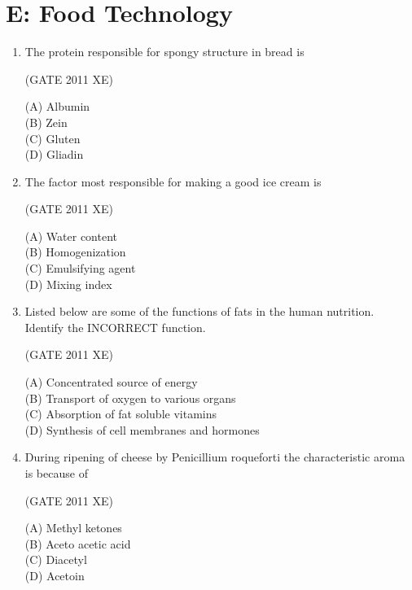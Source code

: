 \documentclass[journal,12pt,onecolumn]{IEEEtran}
\begin{document}
\section*{E: Food Technology}
\vspace{1cm}

\begin{enumerate}

\item The protein responsible for spongy structure in bread is

\hfill{(GATE 2011 XE)} \\
\begin{multicols}{4}
(A) Albumin \\
(B) Zein \\
(C) Gluten \\
(D) Gliadin
\end{multicols}


\item The factor most responsible for making a good ice cream is

\hfill{(GATE 2011 XE)} \\
\begin{multicols}{4}
(A) Water content \\
(B) Homogenization \\
(C) Emulsifying agent \\
(D) Mixing index
\end{multicols}

\item Listed below are some of the functions of fats in the human nutrition. Identify the INCORRECT function.

\hfill{(GATE 2011 XE)} \\
\begin{multicols}{2}
(A) Concentrated source of energy \\
(B) Transport of oxygen to various organs \\
(C) Absorption of fat soluble vitamins \\
(D) Synthesis of cell membranes and hormones
\end{multicols}

\item During ripening of cheese by Penicillium roqueforti the characteristic aroma is because of

\hfill{(GATE 2011 XE)} \\
\begin{multicols}{4}
(A) Methyl ketones \\
(B) Aceto acetic acid \\
(C) Diacetyl \\
(D) Acetoin
\end{multicols}


\end{enumerate}
\end{document}

